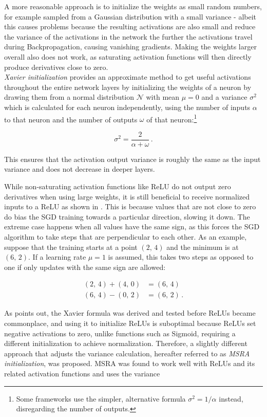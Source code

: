A more reasonable approach is to initialize the weights as small random numbers, for example sampled from a Gaussian distribution with a small variance - albeit this causes problems because the resulting activations are also small and reduce the variance of the activations in the network the further the activations travel during Backpropagation, causing vanishing gradients. Making the weights larger overall also does not work, as saturating activation functions will then directly produce derivatives close to zero. \cite{karpathy_lecture2}\\

\noindent \textit{Xavier initialization} \cite{glorot} provides an approximate method to get useful activations throughout the entire network layers by initializing the weights of a neuron by drawing them from a normal distribution $\mathcal{N}$ with mean $\mu = 0$ and a variance $\sigma^2$ which is calculated for each neuron independently, using the number of inputs $\alpha$ to that neuron and the number of outputs $\omega$ of that neuron:\footnote{Some frameworks use the simpler, alternative formula $\sigma^2 = 1/\alpha$ instead, disregarding the number of outputs.}

\[ \sigma^2 = \frac{2}{\alpha + \omega} \,. \]

\noindent This ensures that the activation output variance is roughly the same as the input variance and does not decrease in deeper layers.

\noindent While non-saturating activation functions like ReLU do not output zero derivatives when using large weights, it is still beneficial to receive normalized inputs to a ReLU as shown in \cite{lecun_norm}. This is because values that are not close to zero do bias the SGD training towards a particular direction, slowing it down. The extreme case happens when all values have the same sign, as this forces the SGD algorithm to take steps that are perpendicular to each other. As an example, suppose that the training starts at a point $(2,\, 4)$ and the minimum is at $(6,\, 2)$. If a learning rate $\mu = 1$ is assumed, this takes two steps as opposed to one if only updates with the same sign are allowed:

\begin {align}
	(2,\, 4) + (4,\, 0) &= (6,\, 4)\\
	(6,\, 4) - (0,\, 2) &= (6,\, 2) \,.
\end {align}

\noindent As \cite{rectifiers} points out, the Xavier formula was derived and tested before ReLUs became commonplace, and using it to initialize ReLUs is suboptimal because ReLUs set negative activations to zero, unlike functions such as Sigmoid, requiring a different initialization to achieve normalization. Therefore, a slightly different approach that adjusts the variance calculation, hereafter referred to as \textit{MSRA initialization}, was proposed. MSRA was found to work well with ReLUs and its related activation functions and uses the variance

